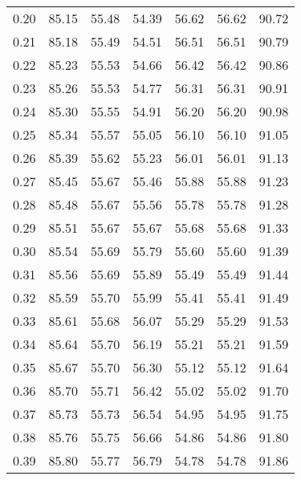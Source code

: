 \begin{tabular}{|c|c|c|c|c|c|c|}
      0.20 &     85.15 &     55.48 &      54.39 &   56.62 &      56.62 &         90.72 \\
      0.21 &     85.18 &     55.49 &      54.51 &   56.51 &      56.51 &         90.79 \\
      0.22 &     85.23 &     55.53 &      54.66 &   56.42 &      56.42 &         90.86 \\
      0.23 &     85.26 &     55.53 &      54.77 &   56.31 &      56.31 &         90.91 \\
      0.24 &     85.30 &     55.55 &      54.91 &   56.20 &      56.20 &         90.98 \\
      0.25 &     85.34 &     55.57 &      55.05 &   56.10 &      56.10 &         91.05 \\
      0.26 &     85.39 &     55.62 &      55.23 &   56.01 &      56.01 &         91.13 \\
      0.27 &     85.45 &     55.67 &      55.46 &   55.88 &      55.88 &         91.23 \\
      0.28 &     85.48 &     55.67 &      55.56 &   55.78 &      55.78 &         91.28 \\
      0.29 &     85.51 &     55.67 &      55.67 &   55.68 &      55.68 &         91.33 \\
      0.30 &     85.54 &     55.69 &      55.79 &   55.60 &      55.60 &         91.39 \\
      0.31 &     85.56 &     55.69 &      55.89 &   55.49 &      55.49 &         91.44 \\
      0.32 &     85.59 &     55.70 &      55.99 &   55.41 &      55.41 &         91.49 \\
      0.33 &     85.61 &     55.68 &      56.07 &   55.29 &      55.29 &         91.53 \\
      0.34 &     85.64 &     55.70 &      56.19 &   55.21 &      55.21 &         91.59 \\
      0.35 &     85.67 &     55.70 &      56.30 &   55.12 &      55.12 &         91.64 \\
      0.36 &     85.70 &     55.71 &      56.42 &   55.02 &      55.02 &         91.70 \\
      0.37 &     85.73 &     55.73 &      56.54 &   54.95 &      54.95 &         91.75 \\
      0.38 &     85.76 &     55.75 &      56.66 &   54.86 &      54.86 &         91.80 \\
      0.39 &     85.80 &     55.77 &      56.79 &   54.78 &      54.78 &         91.86 \\

\end{tabular}
